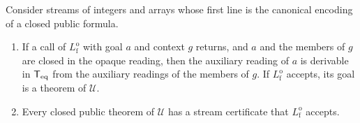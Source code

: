 \begin{proposition}\label{cert:prop:opaque}
Consider streams of integers and arrays whose first line is the canonical encoding of a closed
public formula.
\begin{enumerate}[label=(\alph*)]
\item If a call of $L^{\mathrm o}_{\mathrm f}$ with goal $a$ and context $g$ returns, and $a$ and the
members of $g$ are closed in the opaque reading, then the auxiliary reading of $a$ is derivable in
$\mathsf{T}_{\mathrm{eq}}$ from the auxiliary readings of the members of $g$. If $L^{\mathrm o}_{\mathrm f}$ accepts, its
goal is a theorem of $\mathcal U$.
\item Every closed public theorem of $\mathcal U$ has a stream certificate that
$L^{\mathrm o}_{\mathrm f}$ accepts.
\end{enumerate}
\end{proposition}
